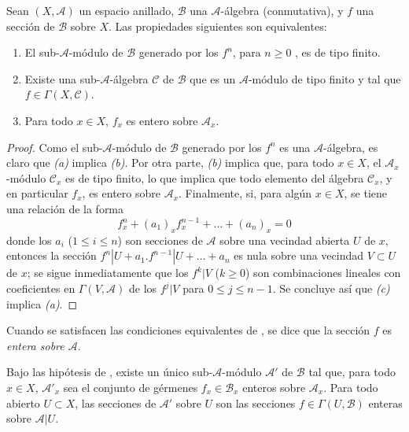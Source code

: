 \documentclass[oneside,10pt]{amsart}
\renewcommand{\leq}{\leqslant}
\renewcommand{\geq}{\geqslant}
\newcommand{\oldpage}[2][]{\marginnote{\normalfont\footnotesize\textbf{#1}~|~#2}\ignorespaces}
\let\EGAOriginalLabel\label
\renewcommand{\label}[1]{\phantomsection\EGAOriginalLabel{#1}}
\begin{document}
\begin{proposition}[6.3.1]
\label{II.6.3.1-fr}
Sean $(X,\mathcal{A})$ un espacio anillado, $\mathcal{B}$ una $\mathcal{A}$-álgebra (conmutativa), y $f$ una sección de $\mathcal{B}$ sobre $X$.
Las propiedades siguientes son equivalentes:
\begin{enumerate}
  \item[{\rm(a)}] El sub-$\mathcal{A}$-módulo de $\mathcal{B}$ generado por los $f^n$, para $n\geq 0$ \textup{}, es de tipo finito.
  \item[{\rm(b)}] Existe una sub-$\mathcal{A}$-álgebra $\mathcal{C}$ de $\mathcal{B}$ que es un $\mathcal{A}$-módulo de tipo finito y tal que $f\in\Gamma(X,\mathcal{C})$.
  \item[{\rm(c)}] Para todo $x\in X$, $f_x$ es entero sobre $\mathcal{A}_x$.
\end{enumerate}
\end{proposition}

\oldpage[II]{117}
\begin{proof}
Como el sub-$\mathcal{A}$-módulo de $\mathcal{B}$ generado por los $f^n$ es una $\mathcal{A}$-álgebra, es claro que \emph{(a)} implica \emph{(b)}.
Por otra parte, \emph{(b)} implica que, para todo $x\in X$, el $\mathcal{A}_x$-módulo $\mathcal{C}_x$ es de tipo finito, lo que implica que todo elemento del álgebra $\mathcal{C}_x$, y en particular $f_x$, es entero sobre $\mathcal{A}_x$.
Finalmente, si, para algún $x\in X$, se tiene una relación de la forma
\[
f_x^n+(a_1)_xf_x^{n-1}+\ldots+(a_n)_x=0
\]
donde los $a_i$ ($1\leq i\leq n$) son secciones de $\mathcal{A}$ sobre una vecindad abierta $U$ de $x$, entonces la sección $f^n|U+a_1.f^{n-1}|U+\ldots+a_n$ es nula sobre una vecindad $V\subset U$ de $x$; se sigue inmediatamente que los $f^k|V$ ($k\geq0$) son combinaciones lineales con coeficientes en $\Gamma(V,\mathcal{A})$ de los $f^j|V$ para $0\leq j\leq n-1$.
Se concluye así que \emph{(c)} implica \emph{(a)}.
\end{proof}

Cuando se satisfacen las condiciones equivalentes de , se dice que la sección $f$ es \emph{entera sobre $\mathcal{A}$}.

\begin{corollary}[6.3.2]
\label{II.6.3.2-fr}
Bajo las hipótesis de \textup{}, existe un único sub-$\mathcal{A}$-módulo $\mathcal{A}'$ de $\mathcal{B}$ tal que, para todo $x\in X$, $\mathcal{A}'_x$ sea el conjunto de gérmenes $f_x\in\mathcal{B}_x$ enteros sobre $\mathcal{A}_x$.
Para todo abierto $U\subset X$, las secciones de $\mathcal{A}'$ sobre $U$ son las secciones $f\in\Gamma(U,\mathcal{B})$ enteras sobre $\mathcal{A}|U$.
\end{corollary}
\end{document}
